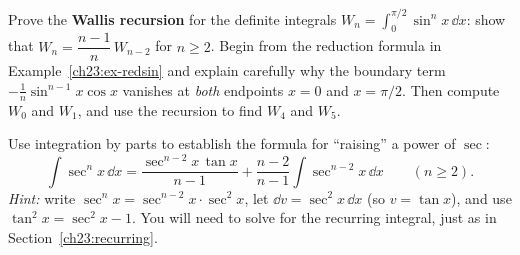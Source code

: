 \begin{exercise}[A proof]
\label{ch23:exr-proof}
Prove the \textbf{Wallis recursion} for the definite integrals
$\displaystyle W_n = \int_0^{\pi/2}\sin^n x\,\dd x$: show that
$W_n = \dfrac{n-1}{n}\,W_{n-2}$ for $n\ge 2$. Begin from the reduction formula in
Example~\ref{ch23:ex-redsin} and explain carefully why the boundary term
$-\frac1n\sin^{n-1}x\cos x$ vanishes at \emph{both} endpoints $x=0$ and
$x=\pi/2$. Then compute $W_0$ and $W_1$, and use the recursion to find
$W_4$ and $W_5$.
\end{exercise}

\begin{exercise}
\label{ch23:exr-further}
Use integration by parts to establish the formula for ``raising'' a power of
$\sec$:
\[
\int \sec^n x\,\dd x = \frac{\sec^{n-2}x\,\tan x}{n-1}
+ \frac{n-2}{n-1}\int \sec^{n-2}x\,\dd x \qquad (n\ge 2).
\]
\textit{Hint:} write $\sec^n x = \sec^{n-2}x\cdot\sec^2 x$, let
$\dd v = \sec^2 x\,\dd x$ (so $v=\tan x$), and use $\tan^2 x = \sec^2 x - 1$. You
will need to solve for the recurring integral, just as in
Section~\ref{ch23:recurring}.
\end{exercise}
